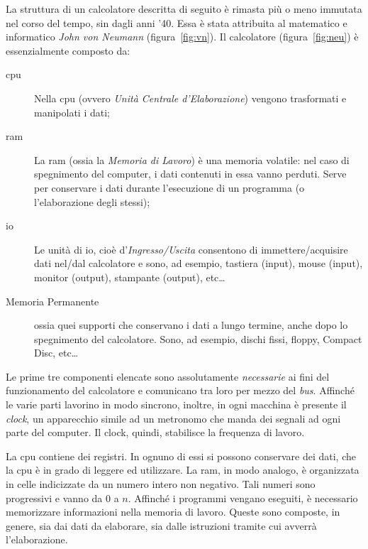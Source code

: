 La struttura di un calcolatore descritta di seguito è rimasta più o meno immutata nel corso del tempo, sin dagli anni '40. Essa è stata attribuita al matematico e informatico \emph{John von Neumann} (figura~\vref{fig:vn}). Il calcolatore (figura~\vref{fig:neu}) è essenzialmente composto da:
\begin{description}
	\item
[\ac{cpu}] Nella \ac{cpu} (ovvero \emph{Unità Centrale d'Elaborazione}) vengono  trasformati e manipolati i dati;
	\item
[\ac{ram}] La \ac{ram} (ossia la \emph{Memoria di Lavoro}) è una memoria volatile: nel caso di spegnimento del computer, i dati contenuti in essa vanno perduti.
Serve per conservare i dati durante l'esecuzione di un programma (o l'elaborazione degli stessi);
	\item
[\ac{io}] Le unità di \ac{io}, cioè d'\emph{Ingresso/Uscita} consentono di immettere/acquisire dati nel/dal calcolatore e sono, ad esempio, tastiera (input), mouse (input), monitor (output), stampante (output), etc\dots
	\item
[Memoria Permanente] ossia quei supporti che conservano i dati a lungo termine, anche dopo lo spegnimento del calcolatore. Sono, ad esempio, dischi fissi, floppy, Compact Disc, etc\dots
\end{description}


Le prime tre componenti elencate sono assolutamente \emph{necessarie} ai fini del funzionamento del calcolatore e comunicano tra loro per mezzo del \emph{bus}.
Affinché le varie parti lavorino in modo sincrono, inoltre, in ogni macchina è presente il \emph{clock}, un apparecchio simile ad un metronomo che manda dei segnali ad ogni parte del computer.
Il clock, quindi, stabilisce la frequenza di lavoro.



La \ac{cpu} contiene dei registri.
In ognuno di essi si possono conservare dei dati, che la \ac{cpu} è in grado di leggere ed utilizzare.
La \ac{ram}, in modo analogo, è organizzata in celle indicizzate da un numero intero non negativo.
Tali numeri sono progressivi e vanno da $0$ a $n$.
Affinché i programmi vengano eseguiti, è necessario memorizzare informazioni nella memoria di lavoro.
Queste sono composte, in genere, sia dai dati da elaborare, sia dalle istruzioni tramite cui avverrà l'elaborazione.

